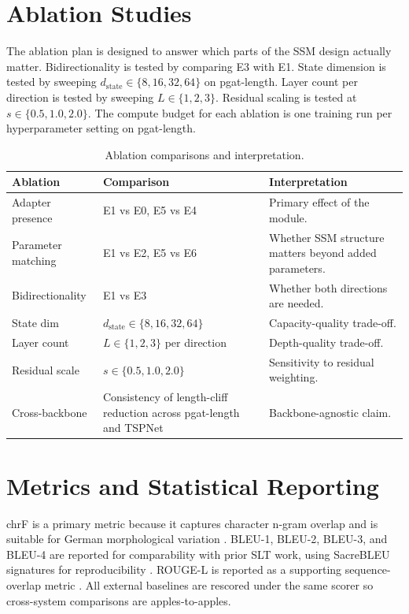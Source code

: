 \section{Ablation Studies}

The ablation plan is designed to answer which parts of the SSM design actually matter. Bidirectionality is tested by comparing E3 with E1. State dimension is tested by sweeping $d_{\text{state}} \in \{8, 16, 32, 64\}$ on pgat-length. Layer count per direction is tested by sweeping $L \in \{1, 2, 3\}$. Residual scaling is tested at $s \in \{0.5, 1.0, 2.0\}$. The compute budget for each ablation is one training run per hyperparameter setting on pgat-length.

\begin{table}[h]
\caption{Ablation comparisons and interpretation.}
\begin{center}
\begin{tabular}{p{1.4in}p{2.1in}p{2.0in}}
\toprule
Ablation & Comparison & Interpretation \\
\midrule
Adapter presence & E1 vs E0, E5 vs E4 & Primary effect of the module. \\
Parameter matching & E1 vs E2, E5 vs E6 & Whether SSM structure matters beyond added parameters. \\
Bidirectionality & E1 vs E3 & Whether both directions are needed. \\
State dim & $d_{\text{state}} \in \{8,16,32,64\}$ & Capacity-quality trade-off. \\
Layer count & $L \in \{1,2,3\}$ per direction & Depth-quality trade-off. \\
Residual scale & $s \in \{0.5,1.0,2.0\}$ & Sensitivity to residual weighting. \\
Cross-backbone & Consistency of length-cliff reduction across pgat-length and TSPNet & Backbone-agnostic claim. \\
\bottomrule
\end{tabular}
\label{tab:ablations}
\end{center}
\end{table}

\section{Metrics and Statistical Reporting}

chrF is a primary metric because it captures character n-gram overlap and is suitable for German morphological variation \citep{popovic2015chrf}. BLEU-1, BLEU-2, BLEU-3, and BLEU-4 are reported for comparability with prior SLT work, using SacreBLEU signatures for reproducibility \citep{post2018sacrebleu}. ROUGE-L is reported as a supporting sequence-overlap metric \citep{lin2004rouge}. All external baselines are rescored under the same scorer so cross-system comparisons are apples-to-apples.


